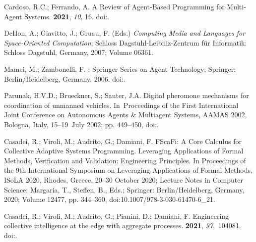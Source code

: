 \documentclass[jsan,article,accept,moreauthors,pdftex]{Definitions/mdpi}
\begin{document}
\begin{thebibliography}{999}
Cardoso, R.C.; Ferrando, A.
\newblock A Review of Agent-Based Programming for Multi-Agent Systems.
 {\bf 2021}, {\em 10}, 16.
\newblock
  doi:{\href{https://doi.org/10.3390/computers10020016}{}}.

DeHon, A.; Giavitto, J.; Gruau, F. (Eds.)
\newblock \emph{Computing Media and Languages for Space-Oriented Computation}; Schloss Dagstuhl-Leibniz-Zentrum für Informatik: Schloss Dagstuhl, Germany, 2007; Volume 06361.

Mamei, M.; Zambonelli, F.
;
  Springer Series on Agent Technology; Springer:  Berlin/Heidelberg, Germany, %
  2006.
\newblock
  doi:{\href{https://doi.org/10.1007/3-540-27969-5}{}}.

Parunak, H.V.D.; Brueckner, S.; Sauter, J.A.
\newblock Digital pheromone mechanisms for coordination of unmanned vehicles.
\newblock   In~Proceedings of the  First International Joint Conference on Autonomous Agents {\&}
  Multiagent Systems, {AAMAS} 2002,  Bologna, Italy, 15--19~July 2002;
pp. 449--450,
\newblock
  doi:{\href{https://doi.org/10.1145/544741.544843}{}}.

Casadei, R.; Viroli, M.; Audrito, G.; Damiani, F.
\newblock FScaFi: {A} Core Calculus for Collective Adaptive Systems
  Programming.
\newblock  Leveraging Applications of Formal Methods, Verification and
  Validation: Engineering Principles. In Proceedings of the 9th International Symposium on
  Leveraging Applications of Formal Methods, ISoLA 2020, Rhodes, Greece,
  20--30 October 2020; Lecture Notes in Computer Science; Margaria, T., Steffen, B., Eds.;
  Springer: Berlin/Heidelberg, Germany, %
 2020; Volume 12477,  pp.
  344--360,
\newblock
  doi:10.1007/978-3-030-61470-6\_21.

Casadei, R.; Viroli, M.; Audrito, G.; Pianini, D.; Damiani, F.
\newblock Engineering collective intelligence at the edge with aggregate
  processes.
 {\bf 2021}, {\em 97},~104081.
\newblock
  doi:{\href{https://doi.org/10.1016/j.engappai.2020.104081}{}}.


\end{thebibliography}
\end{document}
